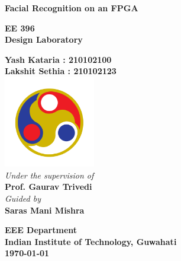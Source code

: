 \documentclass{article}
\begin{document}
\begin{titlepage}
    	
    	\begin{center}
		\begin{LARGE}
		\bf{Facial Recognition on an FPGA\\}
		\end{LARGE}
		\vspace{40pt}
		
		\vspace{6pt}
		\textbf{\Large EE 396}\\
		\vspace{6pt}
		\textbf{\Large Design Laboratory}\\
		\vspace{40pt}
		
		\textbf{\Large
			Yash Kataria : 210102100\\
			Lakshit Sethia : 210102123\\}
		\vspace{60pt}
		\includegraphics[width=0.3\textwidth]{IITG_logo.png} \\
		\vspace{60pt}
		\textit{\large Under the supervision of}\\
            \vspace{2mm}
		\textbf{\Large Prof. Gaurav Trivedi }\\
            \vspace{4mm}
            \textit{\large Guided by} \\
            \vspace{2mm}
            \textbf{\Large Saras Mani Mishra}
		
		
		\vspace{60pt}
		
		
		\textbf{\large EEE Department\\
			Indian Institute of Technology, Guwahati\\
			\today
		}
	\end{center}

\end{titlepage}
\end{document}
